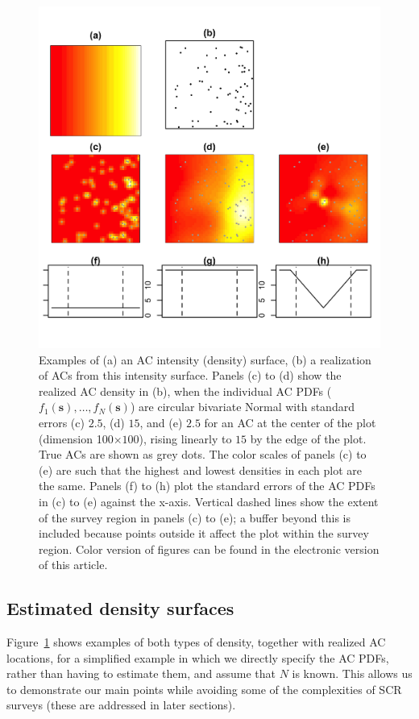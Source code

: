 \documentclass[useAMS,usenatbib,referee]{biom}
\begin{document}
\begin{figure}[htbp]
\centering
\includegraphics[width=\textwidth]{example-densities.jpg}
\caption{Examples of (a) an AC intensity (density) surface, (b) a realization of ACs from this intensity surface. Panels (c) to (d) show the realized AC density in (b), when the individual AC PDFs ($f_1(\bm{s}),\ldots,f_N(\bm{s})$) are circular bivariate Normal with standard errors (c) $2.5$, (d) $15$, and (e) $2.5$ for an AC at the center of the plot (dimension 100$\times100$), rising linearly to $15$ by the edge of the plot. True ACs are shown as grey dots. The color scales of panels (c) to (e) are such that the highest and lowest densities in each plot are the same. Panels (f) to (h) plot the standard errors of the AC PDFs in (c) to (e) against the x-axis. Vertical dashed lines show the extent of the survey region in panels (c) to (e); a buffer beyond this is included because points outside it affect the plot within the survey region. Color version of figures can be found in the electronic version of this article.}
\label{fig:densities}
\end{figure}

\subsection{Estimated density surfaces}
Figure~\ref{fig:densities} shows examples of both types of density, together with realized AC locations, for a simplified example in which we directly specify the AC PDFs, rather than having to estimate them, and assume that $N$ is known. This allows us to demonstrate our main points while avoiding some of the complexities of SCR surveys (these are addressed in later sections). 
\end{document}
